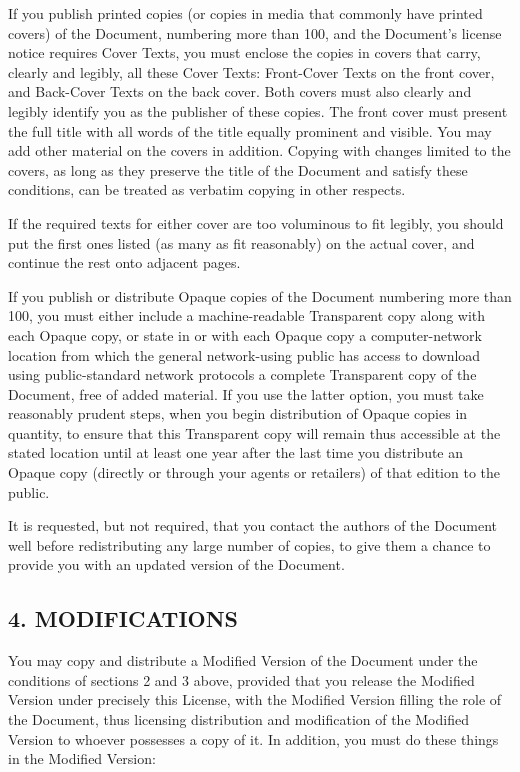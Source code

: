 If you publish printed copies (or copies in media that commonly have printed covers) of the Document, numbering more than 100, and the 
Document's license notice requires Cover Texts, you must enclose the copies in covers that carry, clearly and legibly, all these Cover Texts: 
Front-Cover Texts on the front cover, and Back-Cover Texts on the back cover. Both covers must also clearly and legibly identify you as the 
publisher of these copies. The front cover must present the full title with all words of the title equally prominent and visible. You may 
add other material on the covers in addition. Copying with changes limited to the covers, as long as they preserve the title of the Document 
and satisfy these conditions, can be treated as verbatim copying in other respects.

If the required texts for either cover are too voluminous to fit legibly, you should put the first ones listed (as many as fit reasonably) 
on the actual cover, and continue the rest onto adjacent pages.

If you publish or distribute Opaque copies of the Document numbering more than 100, you must either include a machine-readable Transparent 
copy along with each Opaque copy, or state in or with each Opaque copy a computer-network location from which the general network-using 
public has access to download using public-standard network protocols a complete Transparent copy of the Document, free of added material. 
If you use the latter option, you must take reasonably prudent steps, when you begin distribution of Opaque copies in quantity, to ensure 
that this Transparent copy will remain thus accessible at the stated location until at least one year after the last time you distribute 
an Opaque copy (directly or through your agents or retailers) of that edition to the public.

It is requested, but not required, that you contact the authors of the Document well before redistributing any large number of copies, 
to give them a chance to provide you with an updated version of the Document.


\subsection*{4. MODIFICATIONS}

You may copy and distribute a Modified Version of the Document under the conditions of sections 2 and 3 above, provided that you release the Modified Version under 
precisely this License, with the Modified Version filling the role of the Document, thus licensing distribution and modification of the Modified Version to whoever 
possesses a copy of it. In addition, you must do these things in the Modified Version:

